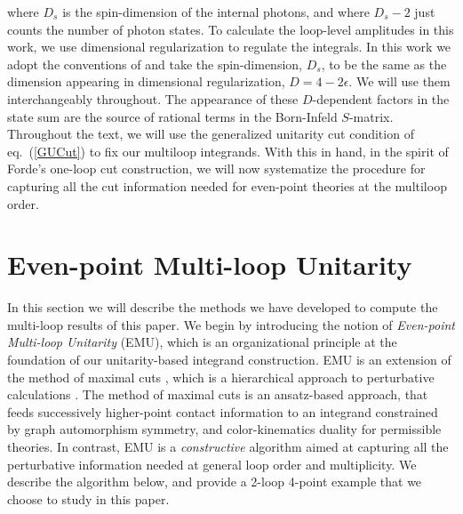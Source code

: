 \documentclass[12pt,letter]{article}
\def\eqn#1{eq.~(\ref{#1})}
\begin{document}
 where $D_s$ is the spin-dimension of the internal photons, and where $D_s-2$ just counts the number of photon states. To calculate the loop-level amplitudes in this work, we use dimensional regularization to regulate the integrals. In this work we adopt the conventions of  \cite{collins_1984,Bern:2002zk} and take the spin-dimension, $D_s$, to be
the same as the dimension appearing in dimensional regularization, $D=4-2\epsilon$. We will use them interchangeably throughout. The appearance of these $D$-dependent factors in the state sum are the source of rational terms in the Born-Infeld $S$-matrix. Throughout the text, we will use the generalized unitarity cut condition of \eqn{GUCut} to fix our multiloop integrands. With this in hand, in the spirit of Forde's one-loop cut construction, we will now systematize the procedure for capturing all the cut information needed for even-point theories at the multiloop order. 
\section{Even-point Multi-loop Unitarity}
\label{sec:EMU}
In this section we will describe the methods we have developed to compute the multi-loop results of this paper. We begin by introducing the notion of \textit{Even-point Multi-loop Unitarity} (EMU), which is an organizational principle at the foundation of our unitarity-based integrand construction. EMU is an extension of the method of maximal cuts \cite{Bern:2007ct}, which is a hierarchical approach to perturbative calculations \cite{Carrasco:2021bmu}. The method of maximal cuts is an ansatz-based approach, that feeds successively higher-point contact information to an integrand constrained by graph automorphism symmetry, and color-kinematics duality for permissible theories. In contrast, EMU is a \textit{constructive} algorithm aimed at capturing all the perturbative information needed at general loop order and multiplicity. We describe the algorithm below, and provide a 2-loop 4-point example that we choose to study in this paper.
\end{document}
